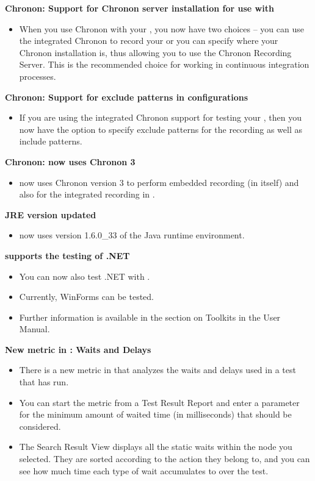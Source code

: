 \textbf{Chronon: Support for Chronon server installation for use with \gdauts{}}
\begin{itemize}
\item When you use Chronon with your \gdaut{}, you now have two choices -- you can use the integrated Chronon to record your \gdaut{} or you can specify where your Chronon installation is, thus allowing you to use the Chronon Recording Server. This is the recommended choice for working in continuous integration processes.   
\end{itemize}

\textbf{Chronon: Support for exclude patterns in \gdaut{} configurations}
\begin{itemize}
\item If you are using the integrated Chronon support for testing your \gdaut{}, then you now have the option to specify exclude patterns for the recording as well as include patterns. 
\end{itemize}

\textbf{Chronon: \app{} now uses Chronon 3}
\begin{itemize}
\item \app{} now uses Chronon version 3 to perform embedded recording (in \app{} itself) and also for the integrated recording in \gdauts{}.
\end{itemize}

\textbf{JRE version updated}
\begin{itemize}
\item \app{} now uses version 1.6.0\_33 of the Java runtime environment.
\end{itemize}


\textbf{\app{} supports the testing of .NET \gdauts{}}
\begin{itemize}
\item You can now also test .NET \gdauts{} with \app{}.
\item Currently, WinForms \gdauts{} can be tested.
\item Further information is available in the section on Toolkits in the User Manual.
\end{itemize}


\textbf{New metric in \app{}: Waits and Delays}\\
\begin{itemize}
\item There is a new metric in \app{} that analyzes the waits and delays used in a test that has run.
\item You can start the metric from a Test Result Report and enter a parameter for the minimum amount of waited time (in milliseconds) that should be considered.
\item The Search Result View displays all the static waits within the node you selected. They are sorted according to the action they belong to, and you can see how much time each type of wait accumulates to over the test.  
\end{itemize}

